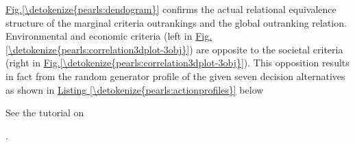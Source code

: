 \documentclass[a4paper,12pt,english]{sphinxhowto}
\begin{document}
\sphinxAtStartPar
\hyperref[\detokenize{pearls:dendogram}]{Fig.\@ \ref{\detokenize{pearls:dendogram}}} confirms the actual relational equivalence structure of the marginal criteria outrankings and the global outranking relation. Environmental and economic criteria (left in \hyperref[\detokenize{pearls:correlation3dplot-3obj}]{Fig.\@ \ref{\detokenize{pearls:correlation3dplot-3obj}}}) are opposite to the societal criteria (right in \hyperref[\detokenize{pearls:correlation3dplot-3obj}]{Fig.\@ \ref{\detokenize{pearls:correlation3dplot-3obj}}}). This opposition results in fact from the random generator profile of the given seven decision alternatives as shown in \hyperref[\detokenize{pearls:actionprofiles}]{Listing \ref{\detokenize{pearls:actionprofiles}}} below %
\begin{footnote}[8]\sphinxAtStartFootnote
See the tutorial on 
%
\end{footnote}.
\def\sphinxLiteralBlockLabel{\label{\detokenize{pearls:actionprofiles}}}
\end{document}
